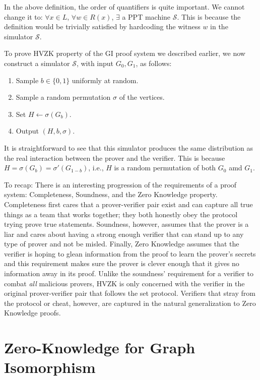 \begin{remark}
In the above definition, the order of quantifiers is quite important. We cannot change it to: $\forall x \in L$, $\forall w\in R(x)$, $\exists$ a PPT machine $\mathcal{S}$. This is because the definition would be trivially satisfied by hardcoding the witness $w$ in the simulator $\mathcal{S}$.
\end{remark}

To prove HVZK property of the GI proof system we described earlier, we now construct a simulator $\mathcal{S}$, with input $G_0, G_1$, as follows:
\begin{enumerate}
	\item Sample $b\in\{0,1\}$ uniformly at random.
	\item Sample a random permutation $\sigma$ of the vertices.
	\item Set $H \gets \sigma(G_b)$.
	\item Output $(H, b, \sigma)$.
\end{enumerate}
It is straightforward to see that this simulator produces the same distribution as the real interaction between the prover and the verifier. This is because $H = \sigma(G_b) = \sigma'(G_{1-b})$, i.e., $H$ is a random permutation of both $G_0$ amd $G_1$. 
	
To recap: There is an interesting progression of the requirements of a proof system: Completeness, Soundness, and the Zero Knowledge property.  Completeness first cares that a prover-verifier pair exist and can capture all true things as a team that works together; they both honestly obey the protocol trying prove true statements.  Soundness, however, assumes that the prover is a liar and cares about having a strong enough verifier that can stand up to any type of prover and not be misled.  Finally, Zero Knowledge assumes that the verifier is hoping to glean information from the proof to learn the prover's secrets and this requirement makes sure the prover is clever enough that it gives no information away in its proof. Unlike the soundness' requirement for a verifier to combat \textit{all} malicious provers, HVZK is only concerned with the verifier in the original prover-verifier pair that follows the set protocol. Verifiers that stray from the protocol or cheat, however, are captured in the natural generalization to Zero Knowledge proofs.

\section{Zero-Knowledge for Graph Isomorphism}

